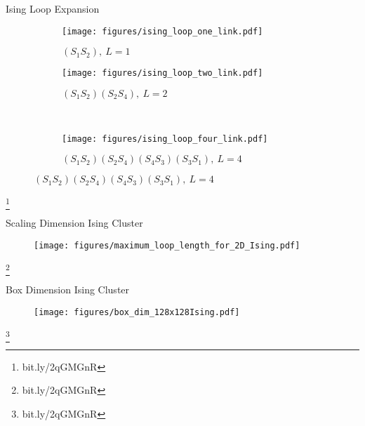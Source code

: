 \documentclass[10pt]{beamer}
\newcommand\blfootnote[1]{%
  \begingroup
  \renewcommand\thefootnote{}\footnote{#1}%
  \addtocounter{footnote}{-1}%
  \endgroup
}
\begin{document}
\begin{frame}{Ising Loop Expansion}
\begin{figure}[h!]
    \begin{subfigure}{.4\linewidth}
        \centering
        \texttt{[image: figures/ising\_loop\_one\_link.pdf]}
        \caption{$(S_1 S_2), \ L = 1$}
    \end{subfigure}%
    \begin{subfigure}{.4\linewidth}
        \centering
        \texttt{[image: figures/ising\_loop\_two\_link.pdf]}
        \caption{$(S_1 S_2)(S_2 S_4), \ L = 2$}
    \end{subfigure}\\[1ex]
    \begin{subfigure}{.8\linewidth}
        \centering
        \texttt{[image: figures/ising\_loop\_four\_link.pdf]}
        \caption{$(S_1 S_2)(S_2 S_4)(S_4 S_3)(S_3 S_1), \ L = 4$}
    \end{subfigure}
\end{figure}
\blfootnote{bit.ly/2qGMGnR}
\end{frame}

\begin{frame}{Scaling Dimension Ising Cluster}
    \begin{figure}[h!]
        \centering
            \texttt{[image: figures/maximum\_loop\_length\_for\_2D\_Ising.pdf]}
    \end{figure}
    \blfootnote{bit.ly/2qGMGnR}
\end{frame}

\begin{frame}{Box Dimension Ising Cluster}
    \begin{figure}[h!]
        \centering
            \texttt{[image: figures/box\_dim\_128x128Ising.pdf]}
    \end{figure}
    \blfootnote{bit.ly/2qGMGnR}
\end{frame}
\end{document}
